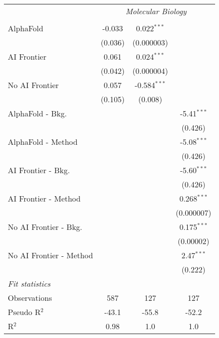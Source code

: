 \begin{tabular}{lccc}
 & \multicolumn{3}{c}{\textit{Molecular Biology}} \\ \\
   AlphaFold               & -0.033  & 0.022$^{***}$  &   \\   
                           & (0.036) & (0.000003)     &   \\   
   AI Frontier             & 0.061   & 0.024$^{***}$  &   \\   
                           & (0.042) & (0.000004)     &   \\   
   No AI Frontier          & 0.057   & -0.584$^{***}$ &   \\   
                           & (0.105) & (0.008)        &   \\   
   AlphaFold - Bkg.        &         &                & -5.41$^{***}$\\   
                           &         &                & (0.426)\\   
   AlphaFold - Method      &         &                & -5.08$^{***}$\\   
                           &         &                & (0.426)\\   
   AI Frontier - Bkg.      &         &                & -5.60$^{***}$\\   
                           &         &                & (0.426)\\   
   AI Frontier - Method    &         &                & 0.268$^{***}$\\   
                           &         &                & (0.000007)\\   
   No AI Frontier - Bkg.   &         &                & 0.175$^{***}$\\   
                           &         &                & (0.00002)\\   
   No AI Frontier - Method &         &                & 2.47$^{***}$\\   
                           &         &                & (0.222)\\   
   \midrule
   \emph{Fit statistics}\\
   Observations            & 587     & 127            & 127\\  
   Pseudo R$^2$            & -43.1   & -55.8          & -52.2\\  
   R$^2$                   & 0.98    & 1.0            & 1.0\\  
   

\end{tabular}

